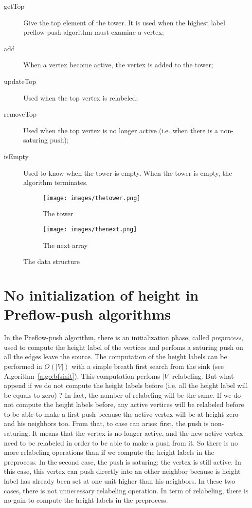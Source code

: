 \begin{description}
	\item[getTop] Give the top element of the tower. It is used when the highest label preflow-push algorithm must examine a vertex;
	\item[add] When a vertex become active, the vertex is added to the tower;
	\item[updateTop] Used when the top vertex is relabeled;
	\item[removeTop] Used when the top vertex is no longer active (i.e. when there is a non-saturing push);
	\item[isEmpty] Used to know when the tower is empty. When the tower is empty, the algorithm terminates.
\end{description}

\begin{figure}
\centering
\begin{subfigure}{.5\textwidth}
  \centering
  \texttt{[image: images/thetower.png]}
  \caption{The tower}
  \label{fig:tower}
\end{subfigure}%
\begin{subfigure}{.5\textwidth}
  \centering
  \texttt{[image: images/thenext.png]}
  \caption{The next array}
  \label{fig:next}
\end{subfigure}
\caption{The data structure}
\label{fig:TheTower}
\end{figure}

\section{No initialization of height in Preflow-push algorithms}
\label{sec:hauteurs}

In the Preflow-push algorithm, there is an initialization phase, called \textit{preprocess}, used to compute the height label of the vertices and perfoms a saturing push on all the edges leave the source. The computation of the height labels can be performed in $O(|V|)$ with a simple breath first search from the sink (see Algorithm~\ref{algo:bfsinit}). This computation perfoms $|V|$ relabeling. But what append if we do not compute the height labels before (i.e. all the height label will be equals to zero) ? In fact, the number of relabeling will be the same. If we do not compute the height labels before, any active vertices will be relabeled before to be able to make a first push because the active vertex will be at height zero and his neighbors too. From that, to case can arise: first, the push is non-saturing. It means that the vertex is no longer active, and the new active vertex need to be relabeled in order to be able to make a push from it. So there is no more relabeling operations than if we compute the height labels in the preprocess. In the second case, the push is saturing: the vertex is still active. In this case, this vertex can push directly into an other neighbor because is height label has already been set at one unit higher than his neighbors. In these two cases, there is not unnecessary relabeling operation. In term of relabeling, there is no gain to compute the height labels in the preprocess. \\


